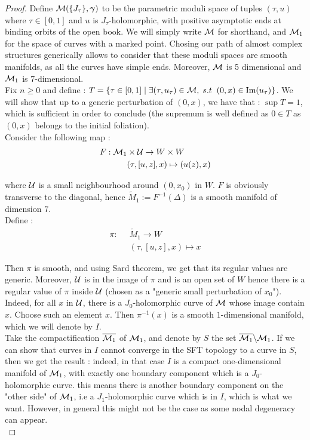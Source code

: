 \documentclass[../main.tex]{subfiles}
\begin{document}
\begin{proof}
Define $\mathcal{M}(\{J_\tau\},\bm{\gamma})$ to be the parametric moduli space of tuples $(\tau,u)$ where $\tau\in [0,1]$ and $u$ is $J_\tau$-holomorphic, with positive asymptotic ends at binding orbits of the open book. We will simply write $\mathcal{M}$ for shorthand, and $\mathcal{M}_1$ for the space of curves with a marked point. Chosing our path of almost complex structures generically allows to consider that these moduli spaces are smooth manifolds, as all the curves have simple ends. Moreover, $\mathcal{M}$ is 5 dimensional and $\mathcal{M}_1$ is 7-dimensional.\\
Fix $n\geq0$ and define : $T= \{\tau \in [0,1]\;|\;\exists (\tau,u_\tau) \in \mathcal{M}, \; s.t \;\;(0,x)\in \text{Im}(u_\tau)\}$. We will show that up to a generic perturbation of $(0,x)$, we have that : $\sup T = 1$, which is sufficient in order to conclude (the supremum is well defined as $0\in T$ as $(0,x)$ belongs to the initial foliation). \\

Consider the following map :
\begin{align*}
F: \mathcal{M}_1&\times \mathcal{U} \rightarrow W\times W\\
&(\tau,[u,z],x)\mapsto (u(z),x)
\end{align*}


where $\mathcal{U}$ is a small neighbourhood around $(0,x_0)$ in $W$. $F$ is obviously transverse to the diagonal, hence $\tilde{M}_1 := F^{-1}(\Delta)$ is a smooth manifold of dimension $7$.\\
Define :
\begin{align*}
\pi : \;\; &\tilde{M}_1 \rightarrow W   \\
& (\tau,[u,z],x)\mapsto x
\end{align*}

Then $\pi$ is smooth, and using Sard theorem, we get that its regular values are generic. Moreover, $\mathcal{U}$ is in the image of $\pi$ and is an open set of $W$ hence there is a regular value of $\pi$ inside $\mathcal{U}$ (chosen as a "generic small perturbation of $x_0$"). Indeed, for all $x$ in $\mathcal{U}$, there is a $J_0$-holomorphic curve of $\mathcal{M}$ whose image contain $x$. Choose such an element $x$. Then $\pi^{-1}(x)$ is a smooth $1$-dimensional manifold, which we will denote by $I$. \\

Take the compactification $\overline{\mathcal{M}_1}$ of $\mathcal{M}_1$, and denote by $S$ the set $\overline{\mathcal{M}_1}\backslash \mathcal{M}_1$. If we can show that curves in $I$ cannot converge in the SFT topology to a curve in $S$, then we get the result :  indeed, in that case $I$ is a compact one-dimensional manifold of $\mathcal{M}_1$, with exactly one boundary component which is a $J_0$-holomorphic curve. this means there is another boundary component on the "other side" of $\mathcal{M}_1$, i.e a $J_1$-holomorphic curve which is in $I$, which is what we want. However, in general this might not be the case as some nodal degeneracy can appear. \\


\end{proof}
\end{document}
